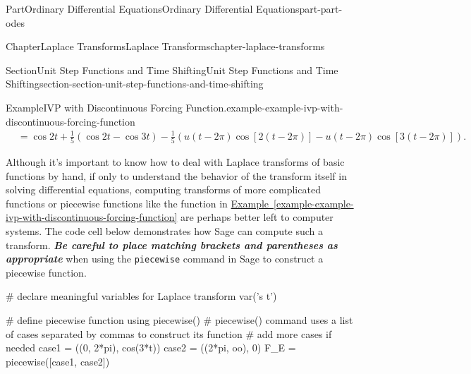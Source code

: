\documentclass[twoside,10pt,]{book}
\newcommand{\xreffont}{\relax}
\newcommand{\mono}[1]{\texttt{#1}}
\newcommand{\alert}[1]{\textbf{\textit{#1}}}
\numberwithin{equation}{part}
\begin{document}
\begin{partptx}{Part}{Ordinary Differential Equations}{}{Ordinary Differential Equations}{}{}{part-part-odes}
\begin{chapterptx}{Chapter}{Laplace Transforms}{}{Laplace Transforms}{}{}{chapter-laplace-transforms}
\begin{sectionptx}{Section}{Unit Step Functions and Time Shifting}{}{Unit Step Functions and Time Shifting}{}{}{section-section-unit-step-functions-and-time-shifting}
\begin{example}{Example}{IVP with Discontinuous Forcing Function.}{example-example-ivp-with-discontinuous-forcing-function}
\begin{align*}
&= \cos2t + \frac{1}{5}\left(\cos2t-\cos3t\right) - \frac{1}{5}\left(u(t-2\pi)\cos[2(t-2\pi)] - u(t-2\pi)\cos[3(t-2\pi)]\right)\text{.}
\end{align*}
%
\end{example}
Although it's important to know how to deal with Laplace transforms of basic functions by hand, if only to understand the behavior of the transform itself in solving differential equations, computing transforms of more complicated functions or piecewise functions like the function in \hyperref[example-example-ivp-with-discontinuous-forcing-function]{Example~{\xreffont\ref{example-example-ivp-with-discontinuous-forcing-function}}} are perhaps better left to computer systems. The code cell below demonstrates how Sage can compute such a transform. \alert{Be careful to place matching brackets and parentheses as appropriate} when using the \mono{piecewise} command in Sage to construct a piecewise function.%
\begin{sageinput}
# declare meaningful variables for Laplace transform
var('s t')

# define piecewise function using piecewise()
# piecewise() command uses a list of cases separated by commas to construct its function
# add more cases if needed
case1 = ((0, 2*pi), cos(3*t))
case2 = ((2*pi, oo), 0)
F_E = piecewise([case1, case2])


\end{sageinput}
\end{sectionptx}
\end{chapterptx}
\end{partptx}
\end{document}
